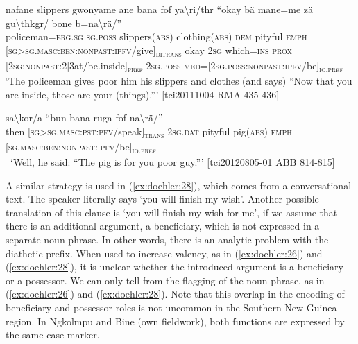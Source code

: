 \documentclass[output=paper]{langscibook}
\begin{document}
	\ea
	 {nafane} {slippers} {gwonyame} {ane} {bana} {fof} {ya\textbackslash{ri}/thr} ``{okay} {bä} {mane=me} {zä} {gu\textbackslash{thkgr}/} {bone} {b=na\textbackslash{rä}/}''\\
	policeman=\textsc{erg}.\textsc{sg}{} \textsc{sg}.\textsc{poss}{} slippers(\textsc{abs}) clothing(\textsc{abs}) \textsc{dem}{} pityful \textsc{emph}{} [\textsc{sg}>\textsc{sg}.\textsc{masc}:\textsc{ben}:\textsc{nonpast}:\textsc{ipfv}/give]\textsubscript{\textsc{ditrans}} okay \textsc{2sg}{} which=\textsc{ins}{} \textsc{prox}{} [\textsc{2sg}:\textsc{nonpast}:2|3at/be.inside]\textsubscript{\textsc{pref}} \textsc{2sg}.\textsc{poss}{} \textsc{med}=[\textsc{2sg}.\textsc{poss}:\textsc{nonpast}:\textsc{ipfv}/be]\textsubscript{\textsc{io.pref}}\\
	\glt `The policeman gives poor him his slippers and clothes (and says) ``Now that you are inside, those are your (things).''' [tci20111004 RMA 435-436]
	\label{ex:doehler:26}
	\z


	\ea
	 sa\textbackslash{kor}/a ``{bun} {bana} {ruga} {fof} {na\textbackslash{rä}}/''\\
	then [\textsc{sg}>\textsc{sg}.\textsc{masc}:\textsc{pst}:\textsc{pfv}/speak]\textsubscript{\textsc{trans}} \textsc{2sg}.\textsc{dat}{} pityful pig(\textsc{abs}) \textsc{emph}{} [\textsc{sg}.\textsc{masc}:\textsc{ben}:\textsc{nonpast}:\textsc{ipfv}/be]\textsubscript{\textsc{io.pref}}\\\
	\glt `Well, he said: ``The pig is for you poor guy.''' [tci20120805-01 ABB 814-815] %
	\label{ex:doehler:27}
	\z


A similar strategy is used in (\ref{ex:doehler:28}), which comes from a conversational text. The speaker literally says `you will finish my wish'. Another possible translation of this clause is `you will finish my wish for me', if we assume that there is an additional argument, a beneficiary, which is not expressed in a separate noun phrase. In other words, there is an analytic problem with the diathetic prefix. When used to increase valency, as in (\ref{ex:doehler:26}) and (\ref{ex:doehler:28}), it is unclear whether the introduced argument is a beneficiary or a possessor. We can only tell from the flagging of the noun phrase, as in (\ref{ex:doehler:26}) and (\ref{ex:doehler:28}). Note that this overlap in the encoding of beneficiary and possessor roles is not uncommon in the Southern New Guinea region. In Ngkolmpu \citep{Carroll2016} and Bine (own fieldwork), both functions are expressed by the same case marker.
\end{document}
